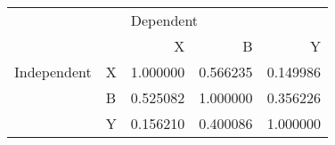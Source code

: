 \begin{tabular}{llrrr}
\toprule
            &   & \multicolumn{3}{l}{Dependent} \\
            &   &         X &         B &         Y \\
\midrule
Independent & X &  1.000000 &  0.566235 &  0.149986 \\
            & B &  0.525082 &  1.000000 &  0.356226 \\
            & Y &  0.156210 &  0.400086 &  1.000000 \\
\bottomrule
\end{tabular}
